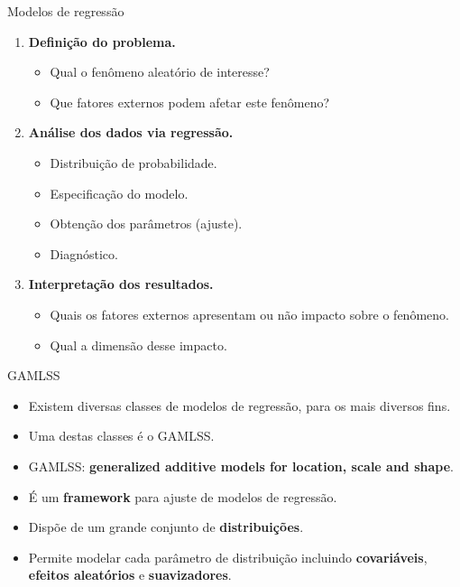 \documentclass[
  ignorenonframetext,
  serif,
  professionalfont,
  usenames,
  dvipsnames,
  aspectratio = 169]{beamer}
\providecommand{\tightlist}{%
  \setlength{\itemsep}{0pt}\setlength{\parskip}{0pt}}
\renewcommand{\tightlist}{%
  \setlength{\itemsep}{0\baselineskip}
  \setlength{\parskip}{0.25\baselineskip}
}
\begin{document}
\begin{frame}{Modelos de regressão}
\protect\hypertarget{modelos-de-regressuxe3o-1}{}
\begin{enumerate}
\tightlist
\item
  \textbf{Definição do problema.}

  \begin{itemize}
  \tightlist
  \item
    Qual o fenômeno aleatório de interesse?
  \item
    Que fatores externos podem afetar este fenômeno?
  \end{itemize}
\item
  \textbf{Análise dos dados via regressão.}

  \begin{itemize}
  \tightlist
  \item
    Distribuição de probabilidade.
  \item
    Especificação do modelo.
  \item
    Obtenção dos parâmetros (ajuste).
  \item
    Diagnóstico.
  \end{itemize}
\item
  \textbf{Interpretação dos resultados.}

  \begin{itemize}
  \tightlist
  \item
    Quais os fatores externos apresentam ou não impacto sobre o
    fenômeno.
  \item
    Qual a dimensão desse impacto.
  \end{itemize}
\end{enumerate}
\end{frame}

\begin{frame}{GAMLSS}
\protect\hypertarget{gamlss}{}
\begin{itemize}
\item
  Existem diversas classes de modelos de regressão, para os mais
  diversos fins.
\item
  Uma destas classes é o GAMLSS.
\item
  GAMLSS:
  \textbf{generalized additive models for location, scale and shape}.
\item
  É um \textbf{framework} para ajuste de modelos de regressão.
\item
  Dispõe de um grande conjunto de \textbf{distribuições}.
\item
  Permite modelar cada parâmetro de distribuição incluindo
  \textbf{covariáveis}, \textbf{efeitos aleatórios} e
  \textbf{suavizadores}.
\end{itemize}
\end{frame}
\end{document}
